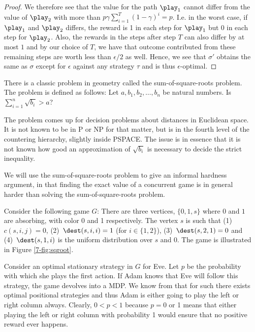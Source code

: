 \begin{proof}
We therefore see that the value for the path $\play_1$ cannot differ from the value of $\play_2$ with more than $p\gamma\sum_{i=1}^T(1-\gamma)^i=p$. I.e. in the worst case, if $\play_1$ and $\play_2$ differs, the reward is 1 in each step for $\play_1$ but 0 in each step for $\play_2$.
Also, the rewards in the steps after step $T$ can also differ by at most $1$ and by our choice of $T$, we have that outcome contributed from these remaining steps are worth less than $\epsilon/2$ as well.
Hence, we see that $\sigma'$ obtains the same as $\sigma$ except for $\epsilon$ against any strategy $\tau$ and is thus $\epsilon$-optimal.













\end{proof}

There is a classic problem in geometry called the sum-of-square-roots problem. The problem is defined as follows:
Let $a,b_1,b_2,\dots,b_n$ be natural numbers. Is $\sum_{i=1}^n\sqrt{b_i}>a$? 

The problem comes up for decision problems about distances in Euclidean space. It is not known to be in P or NP for that matter, but is in the fourth level of the countering hierarchy, slightly inside PSPACE. The issue is in essence that it is not known how good an approximation of $\sqrt{b_i}$ is necessary to decide the strict inequality. 

We will use the sum-of-square-roots problem to give an informal hardness argument, in that finding the exact value of a concurrent game is in general harder than solving the sum-of-square-roots problem. 

Consider the following game $G$:
There are three vertices, $\{0,1,s\}$ where $0$ and $1$ are absorbing, with color 0 and 1 respectively.
The vertex $s$ is such that (1)~$c(s,i,j)=0$, (2)~$\dest(s,i,i)=1$ (for $i\in \{1,2\}$), (3)~$\dest(s,2,1)=0$ and (4)~$\dest(s,1,i)$ is the uniform distribution over $s$ and $0$. The game is illustrated in Figure \cref{7-fig:sqroot}.

Consider an optimal stationary strategy in $G$ for Eve. Let $p$ be the probability with which she plays the first action. If Adam knows that Eve will follow this strategy, the game devolves into a MDP. We know from that for such there exists optimal positional strategies and thus Adam is either going to play the left or right column always. Clearly, $0<p<1$ because $p=0$ or 1 means that either playing the left or right column with probability 1 would ensure that no positive reward ever happens.


